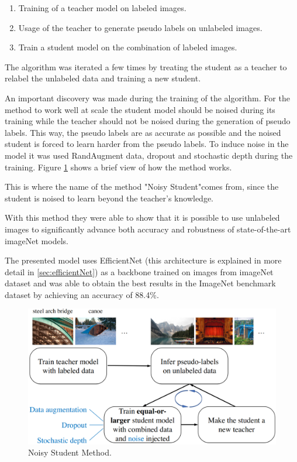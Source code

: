 \begin{enumerate}
    \item Training of a teacher model on labeled images.
    \item Usage of the teacher to generate pseudo labels on unlabeled images.
    \item Train a student model on the combination of labeled images.
\end{enumerate}

\par The algorithm was iterated a few times by treating the student as a teacher to relabel the unlabeled data and training a new student.

\par An important discovery was made during the training of the algorithm. For the method to work well at scale the student model should be noised during its training while the teacher should not be noised during the generation of pseudo labels. This way, the pseudo labels are as accurate as possible and the noised student is forced to learn harder from the pseudo labels. To induce noise in the model it was used RandAugment data, dropout and stochastic depth during the training. Figure \ref{fig:noisestudent} shows a brief view of how the method works.
\par This is where the name of the method "Noisy Student"comes from, since the student is noised to learn beyond the teacher's knowledge.
\par With this method they were able to show that it is possible to use unlabeled images to significantly advance both accuracy and robustness of state-of-the-art imageNet models.
\par The presented model uses EfficientNet (this architecture is explained in more detail in \ref{sec:efficientNet}) as a backbone trained on images from imageNet dataset and was able to obtain the best results in the ImageNet benchmark dataset by achieving an accuracy of 88.4\%.



\begin{figure}[htb]
    \centering
    \includegraphics[scale = 0.15]{Sections/2StateOfTheArt/2_images/noisy_student.png}
    \caption{Noisy Student Method. \cite{Xie2019}} 
    \label{fig:noisestudent}
\end{figure}

